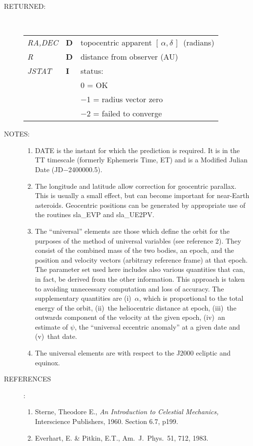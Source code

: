 \documentclass[11pt,twoside]{article}
\newcommand{\radec}     {$[\,\alpha,\delta\,]$}
\newlength{\oldspacing}
\newcommand{\args}[2]
{
  \goodbreak
  \setlength{\oldspacing}{\topsep}
  \setlength{\topsep}{0.3ex}
  \begin{description}
  \item[#1]:\\[1.5ex]
    \begin{tabular}{p{7em}p{6em}p{22em}}
      #2
    \end{tabular}
  \end{description}
  \setlength{\topsep}{\oldspacing}
}
\renewcommand{\args}[2]
   {
     \begin{description}
        \item[#1:]\\
        \begin{tabular}{p{7em}p{6em}l}
           #2
        \end{tabular}
     \end{description}
   }
\newcommand{\spec}[3]
{
  {\em {#1}} & {\bf \mbox{#2}} & {#3}
}
\newcommand{\notes}[1]
{
  \goodbreak
  \setlength{\oldspacing}{\topsep}
  \setlength{\topsep}{0.3ex}
  \begin{description}
    \item[NOTES]:
        #1
  \end{description}
  \setlength{\topsep}{\oldspacing}
}
\renewcommand{\notes}[1]
   {
      \begin{description}
         \item[NOTES:]
            #1
      \end{description}
   }
\newcommand{\refs}[1]
{
  \goodbreak
  \setlength{\oldspacing}{\topsep}
  \setlength{\topsep}{0.3ex}
  \begin{description}
    \item[REFERENCES]:
        #1
  \end{description}
  \setlength{\topsep}{\oldspacing}
}
\newcommand{\refs}[1]
   {
     \begin{description}
       \item[REFERENCES:]
           #1
     \end{description}
   }
\begin{document}
\args{RETURNED}
{
 \spec{RA,DEC}{D}{topocentric apparent \radec\ (radians)} \\
 \spec{R}{D}{distance from observer (AU)} \\
 \spec{JSTAT}{I}{status:} \\
 \spec{}{}{\hspace{2.3em}    0 = OK} \\
 \spec{}{}{\hspace{1.5em} $-$1 = radius vector zero} \\
 \spec{}{}{\hspace{1.5em} $-$2 = failed to converge}
}
\notes
{
 \begin{enumerate}
  \item DATE is the instant for which the prediction is
        required.  It is in the TT timescale (formerly
        Ephemeris Time, ET) and is a
        Modified Julian Date (JD$-$2400000.5).
  \item The longitude and latitude allow correction for geocentric
        parallax.  This is usually a small effect, but can become
        important for near-Earth asteroids.  Geocentric positions
        can be generated by appropriate use of the routines
        sla\_EVP and sla\_UE2PV.
  \item The ``universal'' elements are those which define the orbit for the
        purposes of the method of universal variables (see reference 2).
        They consist of the combined mass of the two bodies, an epoch,
        and the position and velocity vectors (arbitrary reference frame)
        at that epoch.  The parameter set used here includes also various
        quantities that can, in fact, be derived from the other
        information.  This approach is taken to avoiding unnecessary
        computation and loss of accuracy.  The supplementary quantities
        are (i)~$\alpha$, which is proportional to the total energy of the
        orbit, (ii)~the heliocentric distance at epoch,
        (iii)~the outwards component of the velocity at the given epoch,
        (iv)~an estimate of $\psi$, the ``universal eccentric anomaly'' at a
        given date and (v)~that date.
  \item The universal elements are with respect to the J2000 ecliptic
        and equinox.
 \end{enumerate}
}
\refs{
   \begin{enumerate}
   \item Sterne, Theodore E., {\it An Introduction to Celestial Mechanics,}\/
         Interscience Publishers, 1960.  Section 6.7, p199.
   \item Everhart, E. \& Pitkin, E.T., Am.~J.~Phys.~51, 712, 1983.
   \end{enumerate}
}
\end{document}
